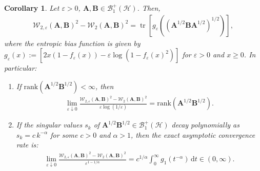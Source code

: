 \documentclass[noinfoline]{imsart}\setcounter{tocdepth}{2}
\newcommand{\m}[1]{\mathbf{#1}}
\renewcommand{\c}[1]{\mathcal{#1}}
\newcommand{\rd}{\mathrm{d}}
\DeclareMathOperator{\tr}{tr}
\theoremstyle{plain}
\newtheorem{corollary}[theorem]{Corollary}
\begin{document}
\begin{corollary}\label{cor:conv:dist}
Let $\varepsilon > 0$, $\m{A}, \m{B} \in \c{B}_{1}^{+}(\c{H})$. Then,
\begin{align*}
    \c{W}_{2, \varepsilon} (\m{A}, \m{B})^{2} - \c{W}_{2} (\m{A}, \m{B})^{2} = \tr [g_{\varepsilon}((\m{A}^{1/2} \m{B} \m{A}^{1/2})^{1/2})],
\end{align*}
where the entropic bias function is given by $g_{\varepsilon}(x) := \left[ 2 x (1-f_{\varepsilon}(x)) - \varepsilon \log (1- f_{\varepsilon}(x)^{2}) \right]$ for $\varepsilon > 0$ and $x \ge 0$.
In particular:
\begin{enumerate}[leftmargin = *]
\item If $\mathrm{rank} (\m{A}^{1/2} \m{B}^{1/2}) < \infty$, then
\begin{align*}
    \lim_{\varepsilon \downarrow 0} \frac{\c{W}_{2, \varepsilon} (\m{A}, \m{B})^{2} - \c{W}_{2} (\m{A}, \m{B})^{2}}{\varepsilon \log (1/\varepsilon)} = \mathrm{rank} (\m{A}^{1/2} \m{B}^{1/2}).
\end{align*}
\item If the singular values $s_{k}$ of $\m{A}^{1/2} \m{B}^{1/2} \in \c{B}_{1}^{+}(\c{H})$ decay polynomially as $s_{k} = c \, k^{-\alpha}$ for some $c > 0$ and $\alpha > 1$, then the exact asymptotic convergence rate is:
\begin{align*}
    \lim_{\varepsilon \downarrow 0} \frac{\c{W}_{2, \varepsilon} (\m{A}, \m{B})^{2} - \c{W}_{2} (\m{A}, \m{B})^{2}}{\varepsilon^{1-1/\alpha}} = c^{1/\alpha} \int_{0}^{\infty} g_{1} (t^{-\alpha}) \, \rd t \in (0, \infty).
\end{align*}
\end{enumerate}
\end{corollary}
\end{document}

